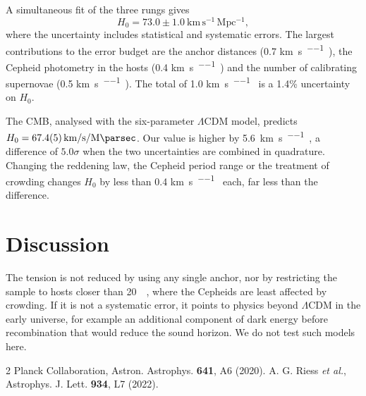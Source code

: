 \documentclass[twocolumn]{aastex631}
\newcommand{\Hnought}{H_0}
\newcommand{\kmsMpc}{\si{\kilo\metre\per\second\per\mega\parsec}}
\begin{document}
A simultaneous fit of the three rungs gives
\begin{equation}
\Hnought = 73.0 \pm 1.0 \ \mathrm{km\,s^{-1}\,Mpc^{-1}},
\label{eq:h0}
\end{equation}
where the uncertainty includes statistical and systematic errors. The largest contributions to the error budget are the anchor distances (0.7 \kmsMpc), the Cepheid photometry in the hosts (0.4 \kmsMpc) and the number of calibrating supernovae (0.5 \kmsMpc). The total of 1.0 \kmsMpc{} is a 1.4\% uncertainty on $\Hnought$.

The CMB, analysed with the six-parameter $\Lambda$CDM model, predicts $\Hnought = \SI{67.4 +- 0.5}{\kilo\metre\per\second\per\mega\parsec}$. Our value is higher by \SI{5.6}{\kilo\metre\per\second\per\mega\parsec}, a difference of $5.0\sigma$ when the two uncertainties are combined in quadrature. Changing the reddening law, the Cepheid period range or the treatment of crowding changes $\Hnought$ by less than 0.4 \kmsMpc{} each, far less than the difference.

\section{Discussion}

The tension is not reduced by using any single anchor, nor by restricting the sample to hosts closer than \SI{20}{\mega\parsec}, where the Cepheids are least affected by crowding. If it is not a systematic error, it points to physics beyond $\Lambda$CDM in the early universe, for example an additional component of dark energy before recombination that would reduce the sound horizon. We do not test such models here.

\begin{thebibliography}{2}
 Planck Collaboration, Astron. Astrophys. \textbf{641}, A6 (2020).
 A. G. Riess \textit{et al.}, Astrophys. J. Lett. \textbf{934}, L7 (2022).
\end{thebibliography}
\end{document}
